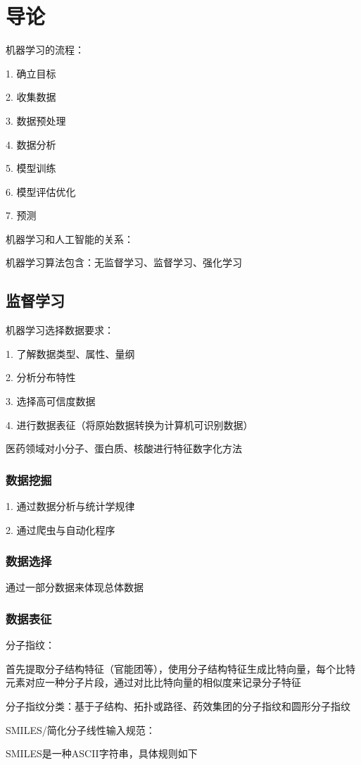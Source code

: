 \section{导论}%
\label{sec:导论}
\begin{notation}
    机器学习的流程：

    1. 确立目标

    2. 收集数据

    3. 数据预处理
    
    4. 数据分析

    5. 模型训练

    6. 模型评估优化

    7. 预测
\end{notation}

机器学习和人工智能的关系：
\begin{center}
\end{center}

机器学习算法包含：无监督学习、监督学习、强化学习
\subsection{监督学习}%
\label{sub:监督学习}
\begin{notation}
    机器学习选择数据要求：

    1. 了解数据类型、属性、量纲

    2. 分析分布特性

    3. 选择高可信度数据

    4. 进行数据表征（将原始数据转换为计算机可识别数据）
\end{notation}
\begin{eg}
    医药领域对小分子、蛋白质、核酸进行特征数字化方法
\end{eg}
\subsubsection{数据挖掘}%
\label{subsub:数据挖掘}
1. 通过数据分析与统计学规律

2. 通过爬虫与自动化程序
\subsubsection{数据选择}%
\label{subsub:数据选择}
通过一部分数据来体现总体数据
\subsubsection{数据表征}%
\label{subsub:数据表征}
\begin{eg}
    分子指纹：

    首先提取分子结构特征（官能团等），使用分子结构特征生成比特向量，每个比特元素对应一种分子片段，通过对比比特向量的相似度来记录分子特征

    分子指纹分类：基于子结构、拓扑或路径、药效集团的分子指纹和圆形分子指纹
\end{eg}

\begin{notation}
    SMILES/简化分子线性输入规范：

    SMILES是一种ASCII字符串，具体规则如下
\end{notation}



